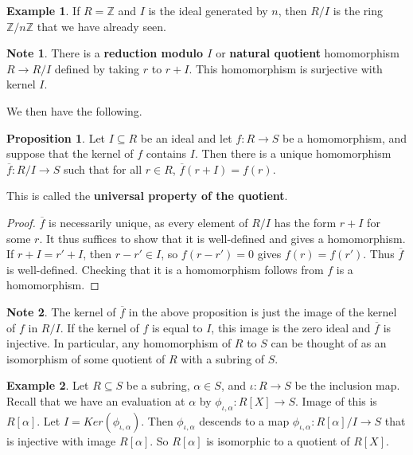 \documentclass{article}
\newcommand{\Z}{\mathbb{Z}}
\newcommand{\rb}[1]{\left( #1 \right)}
\renewcommand{\sb}[1]{\left[ #1 \right]}
\theoremstyle{definition}\newtheorem{definition}{Definition}[section]
\theoremstyle{definition}\newtheorem{remark}[definition]{Remark}
\theoremstyle{definition}\newtheorem*{example}{Example}
\theoremstyle{definition}\newtheorem*{note}{Note}
\newtheorem{proposition}[definition]{Proposition}
\begin{document}
\begin{example}
If $ R = \Z $ and $ I $ is the ideal generated by $ n $, then $ R / I $ is the ring $ \Z / n\Z $ that we have already seen.
\end{example}

\begin{note}
There is a \textbf{reduction modulo $ I $} or \textbf{natural quotient} homomorphism $ R \to R / I $ defined by taking $ r $ to $ r + I $. This homomorphism is surjective with kernel $ I $.
\end{note}

We then have the following.

\begin{proposition}
Let $ I \subseteq R $ be an ideal and let $ f : R \to S $ be a homomorphism, and suppose that the kernel of $ f $ contains $ I $. Then there is a unique homomorphism $ \overline{f} : R / I \to S $ such that for all $ r \in R $, $ \overline{f}\rb{r + I} = f\rb{r} $.
\end{proposition}

This is called the \textbf{universal property of the quotient}.

\begin{proof}
$ \overline{f} $ is necessarily unique, as every element of $ R / I $ has the form $ r + I $ for some $ r $. It thus suffices to show that it is well-defined and gives a homomorphism. If $ r + I = r' + I $, then $ r - r' \in I $, so $ f\rb{r - r'} = 0 $ gives $ f\rb{r} = f\rb{r'} $. Thus $ \overline{f} $ is well-defined. Checking that it is a homomorphism follows from $ f $ is a homomorphism.
\end{proof}

\begin{note}
The kernel of $ \overline{f} $ in the above proposition is just the image of the kernel of $ f $ in $ R / I $. If the kernel of $ f $ is equal to $ I $, this image is the zero ideal and $ \overline{f} $ is injective. In particular, any homomorphism of $ R $ to $ S $ can be thought of as an isomorphism of some quotient of $ R $ with a subring of $ S $.
\end{note}

\begin{example}
Let $ R \subseteq S $ be a subring, $ \alpha \in S $, and $ \iota : R \to S $ be the inclusion map. Recall that we have an evaluation at $ \alpha $ by $ \phi_{\iota, \alpha} : R\sb{X} \to S $. Image of this is $ R\sb{\alpha} $. Let $ I = Ker\rb{\phi_{\iota, \alpha}} $. Then $ \phi_{\iota, \alpha} $ descends to a map $ \phi_{\iota, \alpha} : R\sb{\alpha} / I \to S $ that is injective with image $ R\sb{\alpha} $. So $ R\sb{\alpha} $ is isomorphic to a quotient of $ R\sb{X} $.
\end{example}
\end{document}
